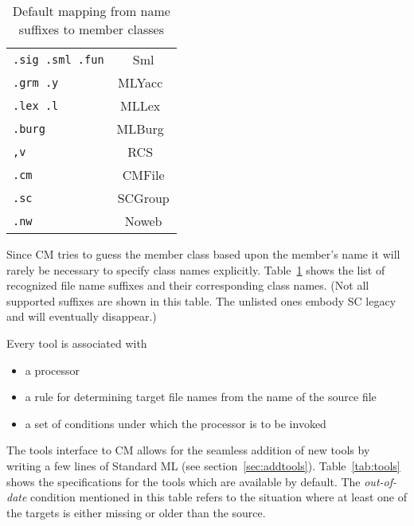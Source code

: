 \documentclass{article}
\begin{document}
\begin{table}
\begin{center}
\begin{tabular}{|l|c|} \hline
{\tt .sig .sml .fun} & Sml \\
{\tt .grm .y} & MLYacc~\cite{tarditi90:yacc} \\
{\tt .lex .l} & MLLex~\cite{appel89:lex} \\
{\tt .burg} & MLBurg~\cite{mlburg93} \\
{\tt ,v } & RCS~\cite{tichy85:rcs} \\
{\tt .cm } & CMFile \\
{\tt .sc } & SCGroup \\
{\tt .nw } & Noweb \\
\hline
\end{tabular}
\end{center}
\caption{Default mapping from name suffixes to member classes}
\label{tab:suffixes}
\end{table}

Since CM tries to guess the member class based upon the member's name
it will rarely be necessary to specify class names explicitly.
Table~\ref{tab:suffixes} shows the list of recognized file name
suffixes and their corresponding class names. (Not all supported
suffixes are shown in this table.  The unlisted ones embody SC legacy
and will eventually disappear.)

Every tool is associated with
{\samepage
\begin{itemize}
\item a processor
\item a rule for determining target file names from the name of the
source file
\item a set of conditions under which the processor is to be invoked
\end{itemize}
}

The tools interface to CM allows for the seamless addition of new
tools by writing a few lines of Standard ML (see section~\ref{sec:addtools}).
Table~\ref{tab:tools} shows the specifications for the tools which are
available by default.  The {\em out-of-date} condition mentioned in
this table refers to the situation where at least one of the targets
is either missing or older than the source.
\end{document}
